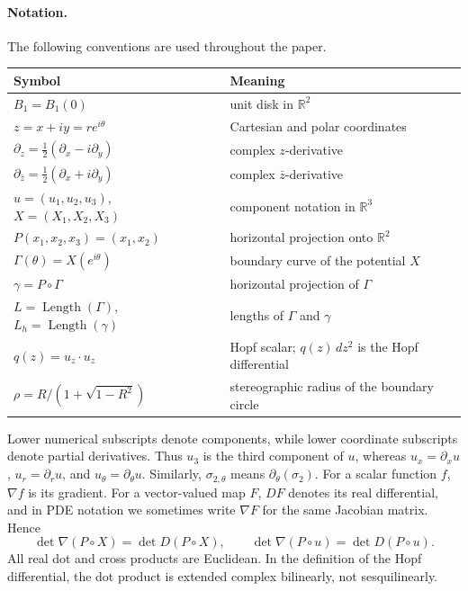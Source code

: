 \documentclass[11pt]{amsart}
\numberwithin{equation}{section}
\theoremstyle{remark}
\newcommand{\R}{\mathbb{R}}
\DeclareMathOperator{\Length}{Length}
\begin{document}
\paragraph{Notation.}
The following conventions are used throughout the paper.
\begin{center}
\small
\renewcommand{\arraystretch}{1.20}
\begin{tabular}{p{}p{}}
\hline
\textbf{Symbol} & \textbf{Meaning} \\
\hline
\(B_1=B_1(0)\) & unit disk in \(\R^2\) \\
\(z=x+iy=re^{i\theta}\) & Cartesian and polar coordinates \\
\(\partial_z=\frac12(\partial_x-i\partial_y)\) & complex \(z\)-derivative \\
\(\partial_{\bar z}=\frac12(\partial_x+i\partial_y)\) & complex \(\bar z\)-derivative \\
\(u=(u_1,u_2,u_3)\), \(X=(X_1,X_2,X_3)\) & component notation in \(\R^3\) \\
\(P(x_1,x_2,x_3)=(x_1,x_2)\) & horizontal projection onto \(\R^2\) \\
\(\Gamma(\theta)=X(e^{i\theta})\) & boundary curve of the potential \(X\) \\
\(\gamma=P\circ\Gamma\) & horizontal projection of \(\Gamma\) \\
\(L=\Length(\Gamma)\), \(L_h=\Length(\gamma)\) & lengths of \(\Gamma\) and \(\gamma\) \\
\(q(z)=u_z\cdot u_z\) & Hopf scalar; \(q(z)\,dz^2\) is the Hopf differential \\
\(\rho=R/(1+\sqrt{1-R^2})\) & stereographic radius of the boundary circle \\
\hline
\end{tabular}
\end{center}
Lower numerical subscripts denote components, while lower coordinate subscripts denote partial derivatives. Thus \(u_3\) is the third
component of \(u\), whereas \(u_x=\partial_xu\), \(u_r=\partial_ru\), and \(u_\theta=\partial_\theta u\). Similarly, \(\sigma_{2,\theta}\)
means \(\partial_\theta(\sigma_2)\). For a scalar function \(f\), \(\nabla f\) is its gradient. For a vector-valued map \(F\), \(DF\) denotes
its real differential, and in PDE notation we sometimes write \(\nabla F\) for the same Jacobian matrix. Hence
\[
\det\nabla(P\circ X)=\det D(P\circ X),
\qquad
\det\nabla(P\circ u)=\det D(P\circ u).
\]
All real dot and cross products are Euclidean. In the definition of the Hopf differential, the dot product is extended complex bilinearly, not
sesquilinearly.
\end{document}
